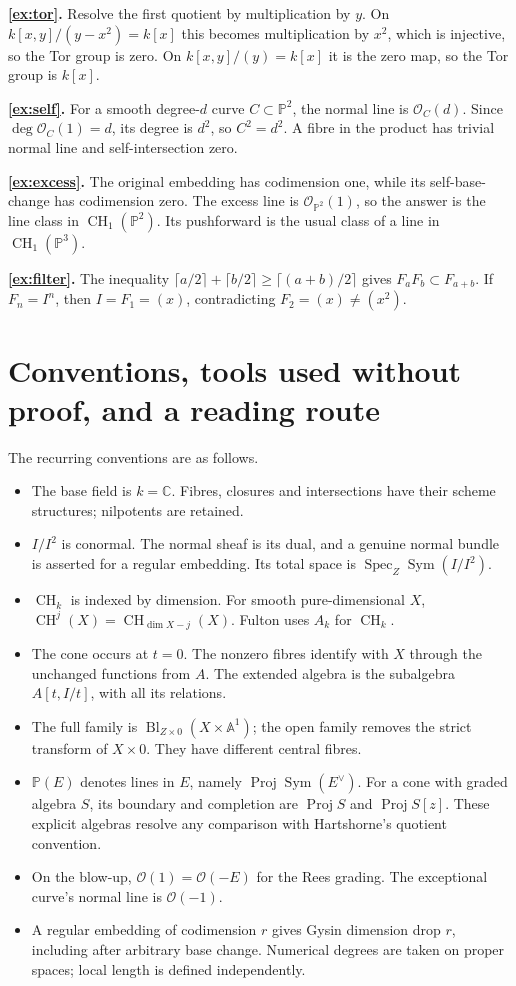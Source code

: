 \documentclass[11pt,a4paper]{article}
\numberwithin{equation}{section}
\theoremstyle{definition}
\newcommand{\A}{\mathbb A}
\newcommand{\PP}{\mathbb P}
\newcommand{\OO}{\mathcal O}
\newcommand{\Spec}{\operatorname{Spec}}
\newcommand{\Proj}{\operatorname{Proj}}
\newcommand{\Sym}{\operatorname{Sym}}
\newcommand{\Bl}{\operatorname{Bl}}
\newcommand{\CH}{\operatorname{CH}}
\begin{document}
\textbf{\ref{ex:tor}.} Resolve the first quotient by multiplication
by $y$. On $k[x,y]/(y-x^2)=k[x]$ this becomes multiplication by
$x^2$, which is injective, so the Tor group is zero. On
$k[x,y]/(y)=k[x]$ it is the zero map, so the Tor group is $k[x]$.

\textbf{\ref{ex:self}.} For a smooth degree-$d$ curve
$C\subset\PP^2$, the normal line is $\OO_C(d)$. Since
$\deg\OO_C(1)=d$, its degree is $d^2$, so $C^2=d^2$.
A fibre in the product has trivial normal line and self-intersection
zero.

\textbf{\ref{ex:excess}.} The original embedding has codimension
one, while its self-base-change has codimension zero. The excess
line is $\OO_{\PP^2}(1)$, so the answer is the line class in
$\CH_1(\PP^2)$. Its pushforward is the usual class of a line
in $\CH_1(\PP^3)$.

\textbf{\ref{ex:filter}.} The inequality
$\lceil a/2\rceil+\lceil b/2\rceil\ge\lceil(a+b)/2\rceil$
gives $F_aF_b\subset F_{a+b}$. If $F_n=I^n$, then
$I=F_1=(x)$, contradicting $F_2=(x)\ne(x^2)$.

\appendix
\section{Conventions, tools used without proof, and a reading route}
\label{app:tools}

The recurring conventions are as follows.
\begin{itemize}
\item The base field is $k=\mathbb C$. Fibres, closures and
intersections have their scheme structures; nilpotents are retained.
\item $I/I^2$ is conormal. The normal sheaf is its dual, and a
genuine normal bundle is asserted for a regular embedding. Its
total space is $\Spec_Z\Sym(I/I^2)$.
\item $\CH_k$ is indexed by dimension. For smooth pure-dimensional
$X$, $\CH^j(X)=\CH_{\dim X-j}(X)$. Fulton uses $A_k$ for $\CH_k$.
\item The cone occurs at $t=0$. The nonzero fibres identify with
$X$ through the unchanged functions from $A$. The extended algebra
is the subalgebra $A[t,I/t]$, with all its relations.
\item The full family is $\Bl_{Z\times0}(X\times\A^1)$; the open
family removes the strict transform of $X\times0$. They have
different central fibres.
\item $\PP(E)$ denotes lines in $E$, namely $\Proj\Sym(E^\vee)$.
For a cone with graded algebra $S$, its boundary and completion are
$\Proj S$ and $\Proj S[z]$. These explicit algebras resolve any
comparison with Hartshorne's quotient convention.
\item On the blow-up, $\OO(1)=\OO(-E)$ for the Rees grading.
The exceptional curve's normal line is $\OO(-1)$.
\item A regular embedding of codimension $r$ gives Gysin dimension
drop $r$, including after arbitrary base change. Numerical degrees
are taken on proper spaces; local length is defined independently.
\end{itemize}
\end{document}
